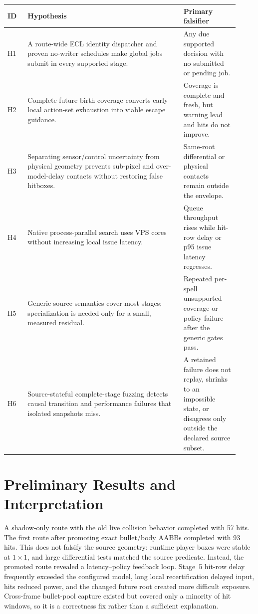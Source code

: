 \documentclass[10pt]{article}
\begin{document}
\begin{center}
\begin{tabular}{p{0.08\linewidth}p{0.62\linewidth}p{0.22\linewidth}}
\toprule
ID & Hypothesis & Primary falsifier \\
\midrule
H1 & A route-wide ECL identity dispatcher and proven no-writer schedules make
global jobs submit in every supported stage. & Any due supported decision with
no submitted or pending job. \\
H2 & Complete future-birth coverage converts early local action-set exhaustion
into viable escape guidance. & Coverage is complete and fresh, but warning
lead and hits do not improve. \\
H3 & Separating sensor/control uncertainty from physical geometry prevents
sub-pixel and over-model-delay contacts without restoring false hitboxes. &
Same-root differential or physical contacts remain outside the envelope. \\
H4 & Native process-parallel search uses VPS cores without increasing local
issue latency. & Queue throughput rises while hit-row delay or p95 issue
latency regresses. \\
H5 & Generic source semantics cover most stages; specialization is needed only
for a small, measured residual. & Repeated per-spell unsupported coverage or
policy failure after the generic gates pass. \\
H6 & Source-stateful complete-stage fuzzing detects causal transition and
performance failures that isolated snapshots miss. & A retained failure does
not replay, shrinks to an impossible state, or disagrees only outside the
declared source subset. \\
\bottomrule
\end{tabular}
\end{center}

\section{Preliminary Results and Interpretation}

A shadow-only route with the old live collision behavior completed with 57
hits.  The first route after promoting exact bullet/body AABBs completed with
93 hits.  This does not falsify the source geometry: runtime player boxes were
stable at $1\times1$, and large differential tests matched the source predicate.
Instead, the promoted route revealed a latency--policy feedback loop.  Stage~5
hit-row delay frequently exceeded the configured model, long local
recertification delayed input, hits reduced power, and the changed future root
created more difficult exposure.  Cross-frame bullet-pool capture existed but
covered only a minority of hit windows, so it is a correctness fix rather than
a sufficient explanation.
\end{document}
